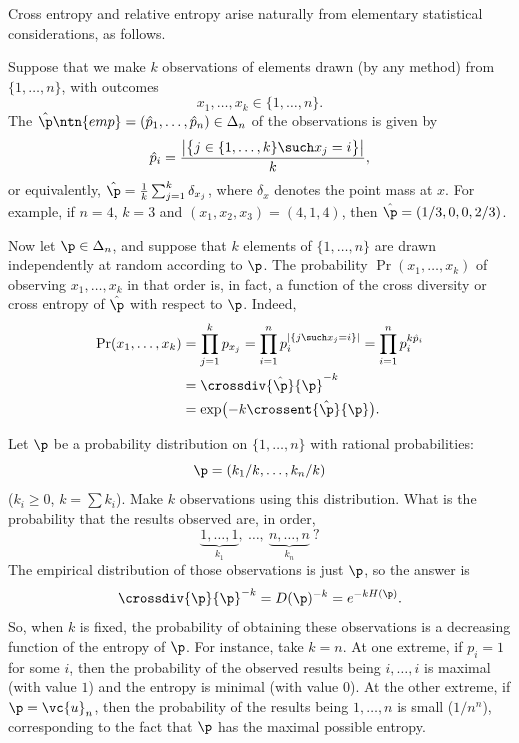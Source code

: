 Cross entropy and relative entropy arise naturally from elementary
statistical considerations, as follows.

Suppose that we make $k$ observations of elements drawn (by any method)
from $\{1, \ldots, n\}$, with outcomes
\[
x_1, \ldots, x_k \in \{1, \ldots, n\}.
\]
The  $\hat{\p}\ntn{emp} = (\hat{p}_1, \ldots, \hat{p}_n) \in
\Delta_n$ of the observations is given by
\[
\hat{p}_i 
=
\frac{\bigl| \bigl\{ j \in \{1, \ldots, k\} \such x_j = i \bigr\} \bigr|}%
{k},
\]
or equivalently, $\hat{\p} = \tfrac{1}{k} \sum_{j = 1}^k \delta_{x_j}$,
where $\delta_x$ denotes the point mass at $x$.  For example, if $n = 4$,
$k = 3$ and $(x_1, x_2, x_3) = (4, 1, 4)$, then $\hat{\p} = (1/3, 0, 0,
2/3)$.

Now let $\p \in \Delta_n$, and suppose that $k$ elements of $\{1, \ldots,
n\}$ are drawn independently at random according to $\p$.  The probability
$\Pr(x_1, \ldots, x_k)$ of observing $x_1, \ldots, x_k$ in that order is,
in fact, a function of the cross diversity or cross entropy of $\hat{\p}$
with respect to $\p$.  Indeed,
% 
\begin{align}
\Pr(x_1, \ldots, x_k)   &
=
\prod_{j = 1}^k p_{x_j}
=
\prod_{i = 1}^n p_i^{|\{j \such x_j = i\}|}     
=
\prod_{i = 1}^n p_i^{k\hat{p}_i}       
\nonumber       \\
&
=
\crossdiv{\hat{\p}}{\p}^{-k}    
\nonumber       \\
&
=
\exp\bigl(-k\crossent{\hat{\p}}{\p}\bigr).
\nonumber
\end{align}

\begin{example}
Let $\p$ be a probability distribution on $\{1, \ldots, n\}$ with rational
probabilities: 
\[
\p = (k_1/k, \ldots, k_n/k)
\]
($k_i \geq 0$, $k = \sum k_i$).  Make $k$ observations using this
distribution.  What is the probability that the results observed are, in
order,
\[
\underbrace{1, \ldots, 1}_{k_1}, 
\ \ldots, \ 
\underbrace{n, \ldots, n}_{k_n}
\ ?
\]
The empirical distribution of those observations is just $\p$, so the
answer is 
\[
\crossdiv{\p}{\p}^{-k} = D(\p)^{-k} = e^{-kH(\p)}.
\]
So, when $k$ is fixed, the probability of obtaining these observations is a
decreasing function of the entropy of $\p$.  For instance, take $k = n$.
At one extreme, if $p_i = 1$ for some $i$, then the probability of the
observed results being $i, \ldots, i$ is maximal (with value $1$) and the
entropy is minimal (with value $0$).  At the other extreme, if $\p =
\vc{u}_n$, then the probability of the results being $1, \ldots, n$ is
small ($1/n^n$), corresponding to the fact that $\p$ has the maximal
possible entropy.
\end{example}

